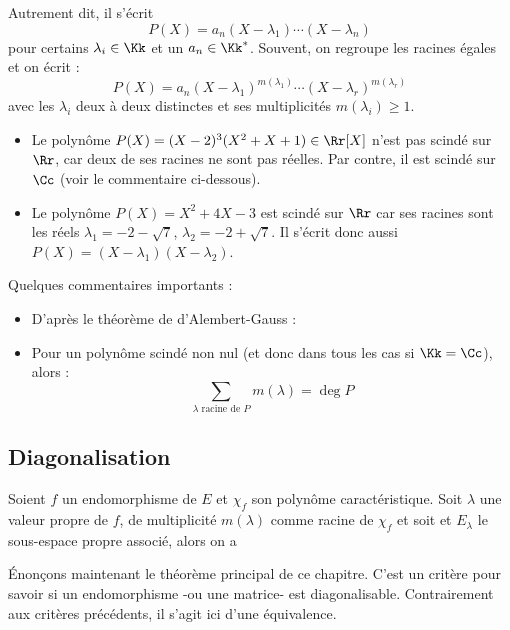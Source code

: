 \documentclass[12pt, class=report,crop=false]{standalone}
\begin{document}
Autrement dit, il s'écrit 
\[P(X) = a_n(X-\lambda_1)\cdots(X-\lambda_n)\]
pour certains $\lambda_i \in \Kk$ et un $a_n \in \Kk^*$. 
Souvent, on regroupe les racines égales et on écrit :
\[P(X) = a_n(X-\lambda_1)^{m(\lambda_1)}\cdots(X-\lambda_r)^{m(\lambda_r)}\]
avec les $\lambda_i$ deux à deux distinctes et ses multiplicités $m(\lambda_i)  \ge 1$.


\begin{exemple}
\sauteligne
\begin{itemize}
  \item Le polynôme $P(X) = (X-2)^3(X^2+X+1) \in \Rr[X]$ n'est pas scindé sur $\Rr$, car deux de ses racines ne sont pas réelles. Par contre, il est scindé sur $\Cc$ (voir le commentaire ci-dessous).
  
  \item Le polynôme $P(X) = X^2+4X-3$ est scindé sur $\Rr$ car ses racines sont les réels
  $\lambda_1 = -2 - \sqrt{7}$, $\lambda_2 = -2 + \sqrt{7}$. Il s'écrit donc aussi $P(X) = (X-\lambda_1)(X-\lambda_2)$.  
\end{itemize}
\end{exemple}

\bigskip

Quelques commentaires importants :
\begin{itemize}
  \item D'après le théorème de d'Alembert-Gauss :
  
  \item Pour un polynôme scindé non nul (et donc dans tous les cas si $\Kk = \Cc$), alors :
\[\sum_{\lambda \text{ racine de } P} m(\lambda) = \deg P\]
\end{itemize}


\subsection{Diagonalisation}


\begin{proposition}
\label{prop:dimElambda}
Soient $f$ un endomorphisme de $E$ et $\chi_f$ son polynôme caractéristique.
Soit $\lambda$ une valeur propre de $f$, de multiplicité $m(\lambda)$  comme racine de $\chi_f$ et soit et $E_\lambda$ le sous-espace propre associé, alors on a
\end{proposition} 


\'Enonçons maintenant le théorème principal de ce chapitre. C'est un critère pour savoir si un endomorphisme -ou une matrice- est diagonalisable. Contrairement aux critères précédents, il s'agit ici d'une équivalence.
\end{document}

